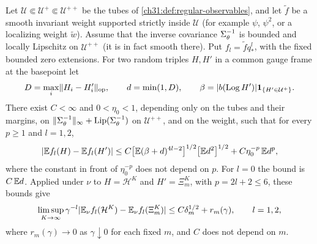 \begin{lemma}\label{ch31:lem:moment-transport-and-schur}
Let $\mathcal U\Subset\mathcal U^+\Subset\mathcal U^{++}$ be the tubes of \cref{ch31:def:regular-observables}, and let $\widetilde f$ be a smooth invariant weight supported strictly inside $\mathcal U$ (for example $\psi$, $\psi^2$, or a localizing weight $\widetilde w$). Assume that the inverse covariance $\Sigma_\theta^{-1}$ is bounded and locally Lipschitz on $\mathcal U^{++}$ (it is in fact smooth there). Put $f_l=\widetilde fq_*^l$, with the fixed bounded zero extensions. For two random triples $H,H'$ in a common gauge frame at the basepoint let
\[
 D=\max_i\lVert H_i-H_i'\rVert_{\rm op},\qquad d=\min(1,D),\qquad\beta=\lvert b(\operatorname{Log} H')\rvert\mathbf 1_{\{H'\in\mathcal U^+\}}.
\]
There exist $C<\infty$ and $0<\eta_0<1$, depending only on the tubes and their margins, on $\lVert \Sigma_\theta^{-1}\rVert_\infty+\operatorname{Lip}(\Sigma_\theta^{-1})$ on $\mathcal U^{++}$, and on the weight, such that for every $p\ge1$ and $l=1,2$,
\[
 \lvert \mathbb E f_l(H)-\mathbb E f_l(H')\rvert\le C\bigl[\mathbb E(\beta+d)^{4l-2}\bigr]^{1/2}\bigl[\mathbb E d^2\bigr]^{1/2}+C\eta_0^{-p}\,\mathbb E d^p,
\]
where the constant in front of $\eta_0^{-p}$ does not depend on $p$. For $l=0$ the bound is $C\,\mathbb E d$. Applied under $\nu$ to $H=\mathcal H^K$ and $H'=\Xi_m^K$, with $p=2l+2\le6$, these bounds give
\[
 \limsup_{K\to\infty}\gamma^{-l}\lvert \mathbb E_\nu f_l(\mathcal H^K)-\mathbb E_\nu f_l(\Xi_m^K)\rvert\le C\delta_m^{1/2}+r_m(\gamma),\qquad l=1,2,
\]
where $r_m(\gamma)\to0$ as $\gamma\downarrow0$ for each fixed $m$, and $C$ does not depend on $m$.
\end{lemma}

